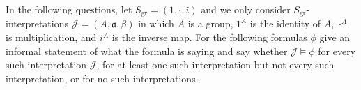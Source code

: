 \documentclass[boxes,pages,color=CornflowerBlue]{homework}
\begin{document}
\begin{problem}
In the following questions, let $S_\text{gr} = (1, \cdot, i)$ and we only consider $S_\text{gr}$-interpretations $\mathcal{J} = (A, \mathfrak{a}, \beta)$ in which $A$ is a group, $1^A$ is the identity of $A$, $\cdot^A$ is multiplication, and $i^A$ is the inverse map.
For the following formulas $\phi$ give an informal statement of what the formula is saying and say whether $\mathcal{J} \vDash \phi$ for every such interpretation $\mathcal{J}$, for at least one such interpretation but not every such interpretation, or for no such interpretations.
\end{problem}
\end{document}
